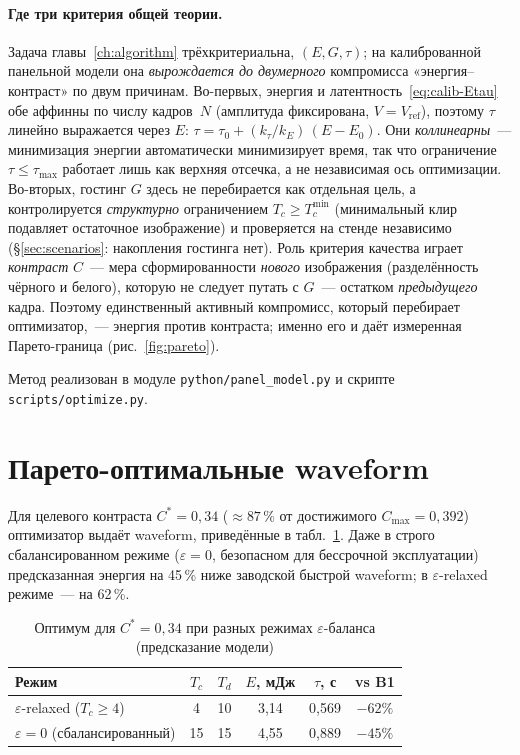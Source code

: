 \paragraph{Где три критерия общей теории.} Задача главы~\ref{ch:algorithm}
трёхкритериальна, $(E,G,\tau)$; на калиброванной панельной модели она
\emph{вырождается до двумерного} компромисса «энергия--контраст» по двум
причинам. Во-первых, энергия и латентность~\eqref{eq:calib-Etau} обе аффинны по
числу кадров~$N$ (амплитуда фиксирована, $V=V_{\mathrm{ref}}$), поэтому $\tau$
линейно выражается через $E$: $\tau=\tau_0+(k_\tau/k_E)\,(E-E_0)$. Они
\emph{коллинеарны}~--- минимизация энергии автоматически минимизирует время, так
что ограничение $\tau\le\tau_{\max}$ работает лишь как верхняя отсечка, а не
независимая ось оптимизации. Во-вторых, гостинг $G$ здесь не перебирается как
отдельная цель, а контролируется \emph{структурно} ограничением
$T_c\ge T_c^{\min}$ (минимальный клир подавляет остаточное изображение) и
проверяется на стенде независимо (\S\ref{sec:scenarios}: накопления гостинга
нет). Роль критерия качества играет \emph{контраст} $C$~--- мера сформированности
\emph{нового} изображения (разделённость чёрного и белого), которую не следует
путать с $G$~--- остатком \emph{предыдущего} кадра. Поэтому единственный активный
компромисс, который перебирает оптимизатор,~--- энергия против контраста; именно
его и даёт измеренная Парето-граница (рис.~\ref{fig:pareto}).

Метод реализован в модуле \verb|python/panel_model.py| и скрипте \verb|scripts/optimize.py|.

\section{Парето-оптимальные waveform}\label{sec:opt-result}

Для целевого контраста $C^{*}=0{,}34$ ($\approx87\,\%$ от достижимого $C_{\max}=0{,}392$)
оптимизатор выдаёт waveform, приведённые в табл.~\ref{tab:opt-result}. Даже в
строго сбалансированном режиме ($\varepsilon=0$, безопасном для бессрочной
эксплуатации) предсказанная энергия на 45\,\% ниже заводской быстрой waveform; в
$\varepsilon$-relaxed режиме~--- на 62\,\%.

\begin{table}[ht]
    \centering
    \caption{Оптимум для $C^{*}=0{,}34$ при разных режимах
        $\varepsilon$-баланса (предсказание модели)}\label{tab:opt-result}
    \begin{tabular}{lccccc}
        \toprule
        Режим & $T_c$ & $T_d$ & $E$, мДж & $\tau$, с & vs B1 \\
        \midrule
        $\varepsilon$-relaxed ($T_c\ge4$) & 4 & 10 & 3{,}14 & 0{,}569 & $-62\%$ \\
        $\varepsilon=0$ (сбалансированный) & 15 & 15 & 4{,}55 & 0{,}889 & $-45\%$ \\
        \bottomrule
    \end{tabular}
\end{table}

